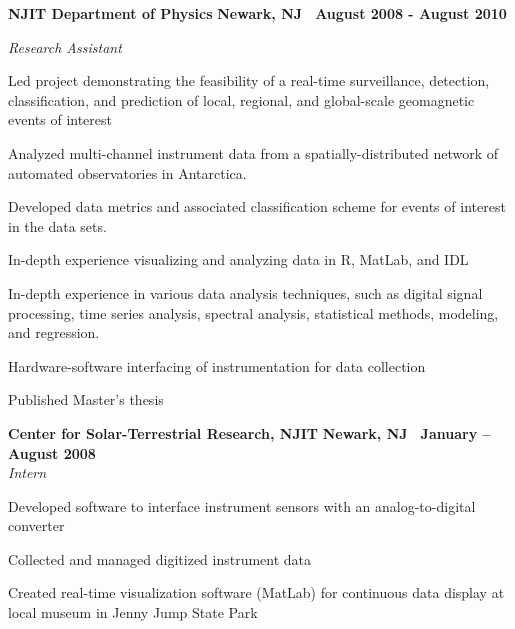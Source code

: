 \documentclass[10pt]{article}
\newcommand{\leftandright}[2]{\noindent\textbf{#1}\hfill
\textbf{#2}}
\begin{document}
\leftandright{NJIT Department of Physics}{Newark, NJ \textbullet\, 
August 2008 - August 2010} \par
\textit{Research Assistant }
\vspace{-0.8em}
\begin{itemize*}
  \item Led project demonstrating the feasibility of a real-time
    surveillance, detection, classification, and prediction of 
    local, regional, and global-scale geomagnetic events of interest
  \item
    Analyzed multi-channel instrument data from a spatially-distributed
    network of automated observatories in Antarctica.
  \item Developed data metrics and associated classification scheme for
    events of interest in the data sets.
  \item In-depth experience visualizing and analyzing data in R, MatLab,
    and IDL
  \item In-depth experience in various data analysis techniques,
    such as digital signal processing, time series analysis, spectral analysis,
    statistical methods, modeling, and regression.
  \item Hardware-software interfacing of instrumentation for data
    collection
  \item Published Master's thesis
\end{itemize*}




\leftandright{Center for Solar-Terrestrial Research, NJIT}{Newark, NJ
\textbullet\, January -- August 2008}\\  
\vspace{-0.8em}
\textit{Intern}
\begin{itemize*}
  \item Developed software to interface instrument sensors with an
    analog-to-digital converter
  \item Collected and managed digitized instrument data
  \item Created real-time visualization software (MatLab) for continuous data display
    at local museum in Jenny Jump State Park
\end{itemize*}
\end{document}
